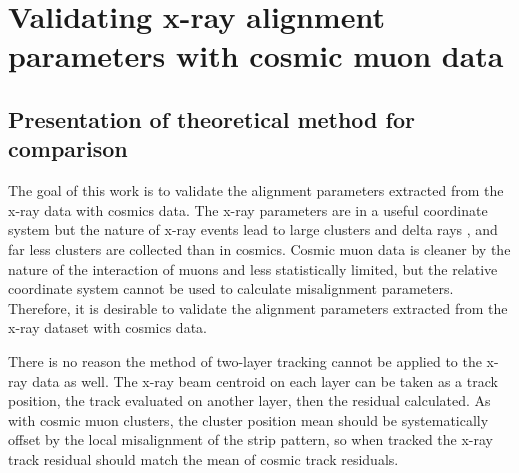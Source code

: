 
\chapter{Validating x-ray alignment parameters with cosmic muon data}

\section{Presentation of theoretical method for comparison}

The goal of this work is to validate the alignment parameters extracted from the x-ray data with cosmics data. 
The x-ray parameters are in a useful coordinate system but the nature of x-ray events lead to large clusters and delta rays \cite{lefebvre_precision_2020}, and far less clusters are collected than in cosmics. Cosmic muon data is cleaner by the nature of the interaction of muons and less statistically limited, but the relative coordinate system cannot be used to calculate misalignment parameters. Therefore, it is desirable to validate the alignment parameters extracted from the x-ray dataset with cosmics data.

There is no reason the method of two-layer tracking cannot be applied to the x-ray data as well. The x-ray beam centroid on each layer can be taken as a track position, the track evaluated on another layer, then the residual calculated. As with cosmic muon clusters, the cluster position mean should be systematically offset by the local misalignment of the strip pattern, so when tracked the x-ray track residual should match the mean of cosmic track residuals. 


